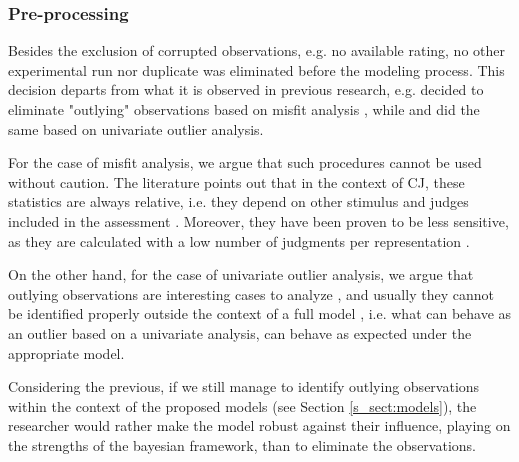 \subsubsection{Pre-processing} \label{ssSA:preprocessing}
%
Besides the exclusion of corrupted observations, e.g. no available rating, no other experimental run nor duplicate was eliminated before the modeling process. This decision departs from what it is observed in previous research, e.g. \citet{Boonen_et_al_2020} decided to eliminate "outlying" observations based on misfit analysis \citep{Lesterhuis_2018}, while \citet{vanDaal_2020} and \citet{Boonen_et_al_2021} did the same based on univariate outlier analysis. 

For the case of misfit analysis, we argue that such procedures cannot be used without caution. The literature points out that in the context of CJ, these statistics are always relative, i.e. they depend on other stimulus and judges included in the assessment \citep{Pollitt_2012a, Pollitt_2012b}. Moreover, they have been proven to be less sensitive, as they are calculated with a low number of judgments per representation \citep{Pollitt_2012a}. 

On the other hand, for the case of univariate outlier analysis, we argue that outlying observations are interesting cases to analyze \citep{McElreath_2020}, and usually they cannot be identified properly outside the context of a full model \citep{McElreath_2020}, i.e. what can behave as an outlier based on a univariate analysis, can behave as expected under the appropriate model. 

Considering the previous, if we still manage to identify outlying observations within the context of the proposed models (see Section \ref{s_sect:models}), the researcher would rather make the model robust against their influence, playing on the strengths of the bayesian framework, than to eliminate the observations. 
%
%
